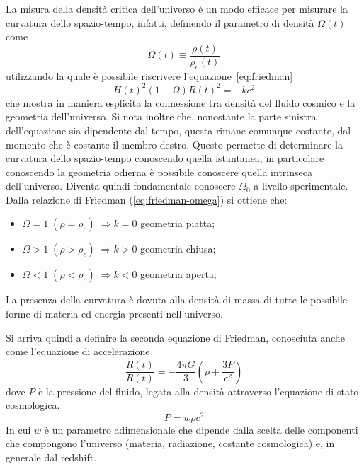 La misura della densità critica dell'universo è un modo efficace per misurare la curvatura dello spazio-tempo, infatti, definendo il parametro di densità $\Omega(t)$ come
\begin{equation}\label{eq:parametro-densità}
    \Omega (t) \equiv  \frac{\rho (t)}{\rho_c (t)}
\end{equation}
utilizzando la quale è possibile riscrivere l'equazione~\ref{eq:friedman}
\begin{equation}\label{eq:friedman-omega}
    H(t)^2 (1-\Omega)R(t)^2 = -kc^2
\end{equation}
che mostra in maniera esplicita la connessione tra densità del fluido cosmico e la geometria dell'universo. Si nota inoltre che, nonostante la parte sinistra dell'equazione sia dipendente dal tempo, questa rimane comunque costante, dal momento che è costante il membro destro. Questo permette di determinare la curvatura dello spazio-tempo conoscendo quella istantanea, in particolare conoscendo la geometria odierna è possibile conoscere quella intrinseca dell'universo. Diventa quindi fondamentale conoscere $\Omega_0$ a livello sperimentale.
Dalla relazione di Friedman (\ref{eq:friedman-omega}) si ottiene che:
\begin{itemize}
    \item $\Omega = 1 \; (\rho = \rho_c)\; \Rightarrow k = 0$ geometria piatta;
    \item $\Omega > 1 \; (\rho > \rho_c)\; \Rightarrow k > 0$ geometria chiusa;
    \item $\Omega < 1 \; (\rho < \rho_c)\; \Rightarrow k < 0$ geometria aperta;
\end{itemize}
La presenza della curvatura è dovuta alla densità di massa di tutte le possibile forme di materia ed energia presenti nell'universo.

Si arriva quindi a definire la seconda equazione di Friedman, conosciuta anche come l'equazione di accelerazione
\begin{equation}\label{eq:second-friedman}
    \frac{\ddot{R}(t)}{R(t)} = - \frac{4\pi G}{3} \left( {\rho + \frac{3P}{c^2}} \right)
\end{equation}
dove $P$ è la pressione del fluido, legata alla densità attraverso l'equazione di stato cosmologica.
\begin{equation}\label{eq:equazione-stato}
    P = w \rho c^2
\end{equation}
In cui $w$ è un parametro adimensionale che dipende dalla scelta delle componenti che compongono l'universo (materia, radiazione, costante cosmologica) e, in generale dal redshift.